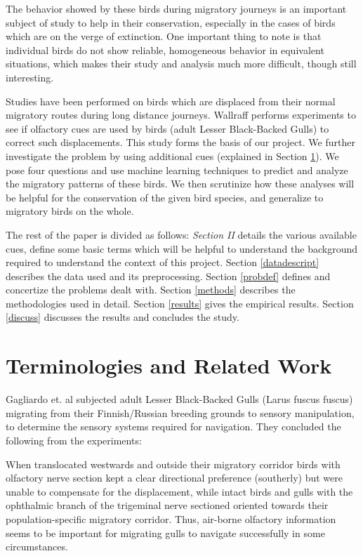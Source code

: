 \documentclass[letterpaper, 10pt, conference]{ieeeconf}  %
\begin{document}
    The behavior showed by these birds during migratory journeys is an important subject of study to help in their conservation, especially in the cases of birds which are on the verge of extinction. One important thing to note is that individual birds do not show reliable, homogeneous behavior in equivalent situations, which makes their study and analysis much more difficult, though still interesting.
    
   Studies have been performed on birds which are displaced from their normal migratory routes during long distance journeys. Wallraff \cite{wallbook} performs experiments to see if olfactory cues are used by birds (adult Lesser Black-Backed Gulls) to correct such displacements. This study forms the basis of our project. We further investigate the problem by using additional cues (explained in Section \ref{terms}). We pose four questions and use machine learning techniques to predict and analyze the migratory patterns of these birds. We then scrutinize how these analyses will be helpful for the conservation of the given bird species, and generalize to migratory birds on the whole.

   The rest of the paper is divided as follows: \textit{Section II} details the various available cues, define some basic terms which will be helpful to understand the background required to understand the context of this project. Section \ref{datadescript} describes the data used and its preprocessing. Section \ref{probdef} defines and concertize the problems dealt with. Section \ref{methods} describes the methodologies used in detail. Section \ref{results} gives the empirical results. Section \ref{discuss} discusses the results and concludes the study.
	
\section{Terminologies and Related Work} \label{terms}

	Gagliardo et. al \cite{navigation} subjected adult Lesser Black-Backed Gulls (Larus fuscus fuscus) migrating from their Finnish/Russian breeding grounds to sensory manipulation, to determine the sensory systems required for navigation. They concluded the following from the experiments: 
    
    \begin{displayquote}
    When translocated westwards and outside their migratory corridor birds with olfactory nerve section kept a clear directional preference (southerly) but were unable to compensate for the displacement, while intact birds and gulls with the ophthalmic branch of the trigeminal nerve sectioned oriented towards their population-specific migratory corridor. Thus, air-borne olfactory information seems to be important for migrating gulls to navigate successfully in some circumstances.
    \end{displayquote}
    
\end{document}
